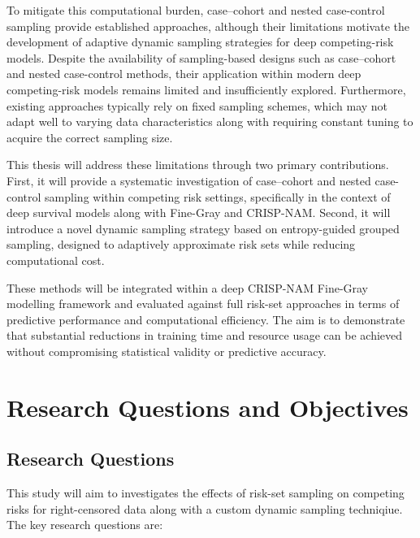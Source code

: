 \documentclass[a4paper,twoside,12pt]{report}
\begin{document}
To mitigate this computational burden, case–cohort and nested case-control sampling provide established approaches, although their limitations motivate the development of adaptive dynamic sampling strategies for deep competing-risk models. Despite the availability of sampling-based designs such as case–cohort \citep{Prentice1986} and nested case-control methods, their application within modern deep competing-risk models remains limited and insufficiently explored. Furthermore, existing approaches typically rely on fixed sampling schemes, which may not adapt well to varying data characteristics along with requiring constant tuning to acquire the correct sampling size.

This thesis will address these limitations through two primary contributions. First, it will provide a systematic investigation of case–cohort and nested case-control sampling within competing risk settings, specifically in the context of deep survival models along with Fine-Gray and CRISP-NAM. Second, it will introduce a novel dynamic sampling strategy based on entropy-guided grouped sampling, designed to adaptively approximate risk sets while reducing computational cost.

These methods will be integrated within a deep CRISP-NAM Fine-Gray modelling framework and evaluated against full risk-set approaches in terms of predictive performance and computational efficiency. The aim is to demonstrate that substantial reductions in training time and resource usage can be achieved without compromising statistical validity or predictive accuracy.

\section{Research Questions and Objectives}

\subsection{Research Questions}

This study will aim to investigates the effects of risk-set sampling on competing risks for right-censored data along with a custom dynamic sampling techniqiue. 
The key research questions are:
\end{document}
